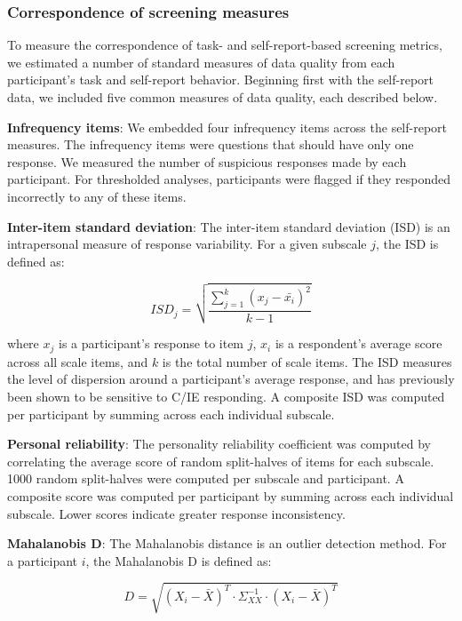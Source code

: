 \documentclass[a4paper,notitlepage,12pt]{article}
\begin{document}
\subsubsection{Correspondence of screening measures}

To measure the correspondence of task- and self-report-based screening metrics, we estimated a number of standard measures of data quality from each participant's task and self-report behavior. Beginning first with the self-report data, we included five common measures of data quality, each described below.

\textbf{Infrequency items}: We embedded four infrequency items across the self-report measures. The infrequency items were questions that should have only one response. We measured the number of suspicious responses made by each participant. For thresholded analyses, participants were flagged if they responded incorrectly to any of these items.

\textbf{Inter-item standard deviation}: The inter-item standard deviation (ISD) is an intrapersonal measure of response variability. For a given subscale $j$, the ISD is defined as:

\begin{equation*}
    ISD_j = \sqrt{\frac{\sum^k_{j=1}(x_j - \bar{x_i})^2}{k-1}}
\end{equation*}

where $x_j$ is a participant's response to item $j$, $x_i$ is a respondent's average score across all scale items, and $k$ is the total number of scale items. The ISD measures the level of dispersion around a participant's average response, and has previously been shown to be sensitive to C/IE responding. A composite ISD was computed per participant by summing across each individual subscale.

\textbf{Personal reliability}: The personality reliability coefficient was computed by correlating the average score of random split-halves of items for each subscale. 1000 random split-halves were computed per subscale and participant.  A composite score was computed per participant by summing across each individual subscale. Lower scores indicate greater response inconsistency.

\textbf{Mahalanobis D}: The Mahalanobis distance is an outlier detection method. For a participant $i$, the Mahalanobis D is defined as:

\begin{equation*}
    D = \sqrt{(X_i - \bar{X})^T \cdot \Sigma^{-1}_{XX} \cdot (X_i - \bar{X})^T }
\end{equation*}
\end{document}
